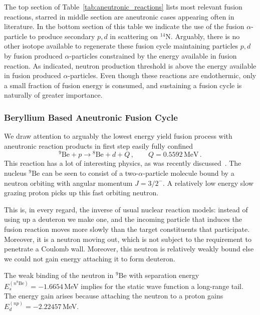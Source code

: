 \documentclass[particles,article,accept,pdftex,moreauthors]{Definitions/mdpi}
\newcommand{\rt}[1]{Table~\ref{#1}}
\begin{document}
The top section of \rt{tab:aneutronic_reactions} lists most relevant fusion reactions, starred in middle section are aneutronic cases appearing often in literature. In the bottom section of this table we indicate the use of the fusion $\alpha$-particle to produce secondary $p,d$ in scattering on ${}^{14}\mathrm{N}$. Arguably, there is no other isotope available to regenerate these fusion cycle maintaining particles $p,d$ by fusion produced $\alpha$-particles constrained by the energy available in fusion reaction. As indicated, neutron production threshold is above the energy available in fusion produced $\alpha$-particles. Even though these reactions are endothermic, only a small fraction of fusion energy is consumed, and sustaining a fusion cycle is naturally of greater importance. 

\subsubsection{Beryllium Based Aneutronic Fusion Cycle} \label{ssec:Beryl}
We draw attention to arguably the lowest energy yield fusion process with aneutronic reaction products in first step easily fully confined 
\begin{equation}
^9\mathrm{Be}+p\to\! ^8\mathrm{Be}+d + Q \,,\qquad Q=0.5592\,\mathrm{MeV}\,.
\label{eq:9Bep-8Ben}
\end{equation}
This reaction has a lot of interesting physics, as was recently discussed~\cite{Rafelski:2025uio}. The nucleus ${}^9\mathrm{Be}$ can be seen to consist of a two-$\alpha$-particle molecule bound by a neutron orbiting with angular momentum $J=3/2^-$. A relatively low energy slow grazing proton picks up this fast orbiting neutron.

This is, in every regard, the inverse of usual nuclear reaction models: instead of using up a deuteron we make one, and the incoming particle that induces the fusion reaction moves more slowly than the target constituents that participate. Moreover, it is a neutron moving out, which is not subject to the requirement to penetrate a Coulomb wall. Moreover, this neutron is relatively weakly bound else we could not gain energy attaching it to form deuteron.

The weak binding of the neutron in ${}^9\mathrm{Be}$ with separation energy $E_s^{(n^8\mathrm{Be})}=-1.6654$\,MeV implies for the static wave function a long-range tail. The energy gain arises because attaching the neutron to a proton gains $E_d^{(np)}=-2.22457$\,MeV.
\end{document}
